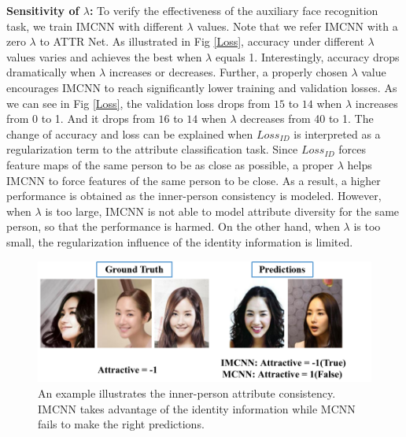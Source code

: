 \documentclass[wcp]{jmlr}
\begin{document}
	\textbf{Sensitivity of $\lambda$:} To verify the effectiveness of the auxiliary face recognition task, we train IMCNN with different $\lambda$ values. Note that we refer IMCNN with a zero $\lambda$ to ATTR Net. As illustrated in Fig \ref{Loss}, accuracy under different $\lambda$ values varies and achieves the best when $\lambda$ equals 1. Interestingly, accuracy drops dramatically when $\lambda$ increases or decreases. Further, a properly chosen $\lambda$ value encourages IMCNN to reach significantly lower training and validation losses. As we can see in Fig \ref{Loss}, the validation loss drops from $15$ to $14$ when $\lambda$ increases from 0 to 1. And it drops from $16$ to $14$ when $\lambda$ decreases from 40 to 1. The change of accuracy and loss can be explained when $Loss_{ID}$ is interpreted as a regularization term to the attribute classification task. Since $Loss_{ID}$ forces feature maps of the same person to be as close as possible, a proper $\lambda$ helps IMCNN to force features of the same person to be close. As a result, a higher performance is obtained as the inner-person consistency is modeled. However, when $\lambda$ is too large, IMCNN is not able to model attribute diversity for the same person, so that the performance is harmed. On the other hand, when $\lambda$ is too small, the regularization influence of the identity information is limited.
	
	\begin{figure}[htb]
		\begin{center}
			\centering\includegraphics[width=16cm]{./new_imgs/attractive_8.png}
		\end{center}
		\caption{An example illustrates the inner-person attribute consistency. IMCNN takes advantage of the identity information while MCNN fails to make the right predictions.}
		\label{example}
	\end{figure}
	
\end{document}
